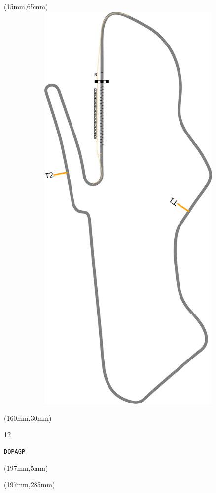 \begin{textblock*}{185mm}(15mm,65mm)%
\centering
\mbox{\includegraphics[width=185mm,height=210mm,keepaspectratio]{PT/DOPAGP.pdf}}
\end{textblock*}
\begin{textblock*}{40mm}(160mm,30mm)%
\Large
\par{} 
\par12 
\par\hfill\tiny\tt DOPAGP\\
\end{textblock*}
\begin{textblock*}{20mm}(197mm,5mm)%
\fbox{\thepage}
\label{DOPAGP}
\end{textblock*}
\begin{textblock*}{20mm}(197mm,285mm)%
\fbox{\thepage}
\end{textblock*}

